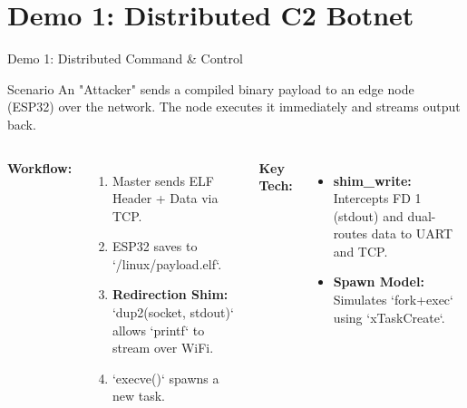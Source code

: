 \documentclass{beamer}
\begin{document}
\section{Demo 1: Distributed C2 Botnet}
\begin{frame}{Demo 1: Distributed Command & Control}
    \begin{block}{Scenario}
        An "Attacker" sends a compiled binary payload to an edge node (ESP32) over the network. The node executes it immediately and streams output back.
    \end{block}

    \begin{columns}
        \textbf{Workflow:}
        \begin{enumerate}
            \item Master sends ELF Header + Data via TCP.
            \item ESP32 saves to `/linux/payload.elf`.
            \item \textbf{Redirection Shim:} `dup2(socket, stdout)` allows `printf` to stream over WiFi.
            \item `execve()` spawns a new task.
        \end{enumerate}

        \textbf{Key Tech:}
        \begin{itemize}
            \item \textbf{shim\_write:} Intercepts FD 1 (stdout) and dual-routes data to UART and TCP.
            \item \textbf{Spawn Model:} Simulates `fork+exec` using `xTaskCreate`.
        \end{itemize}
    \end{columns}
\end{frame}

\end{document}

